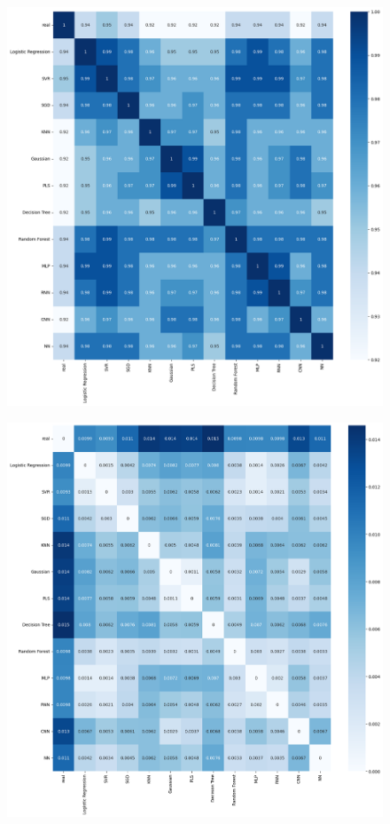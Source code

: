 \begin{figure}[H]
    \centering
    \includegraphics[width=\textwidth]{images/pred_corr.png}
    \caption{}
    \label{pred_corr}
\end{figure}

\begin{figure}[H]
    \centering
    \includegraphics[width=\textwidth]{images/mse_matrix.png}
    \caption{}
    \label{mse-matrix}
\end{figure}

